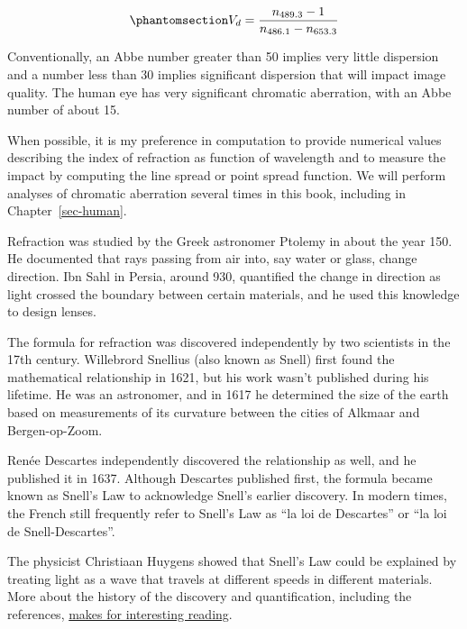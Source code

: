 \documentclass[
  letterpaper,
]{book}
\begin{document}
\begin{equation}\phantomsection\label{eq-abbe}{ 
V_d = \frac{n_{489.3} - 1}{n_{486.1} - n_{653.3}}
}\end{equation}

Conventionally, an Abbe number greater than 50 implies very little
dispersion and a number less than 30 implies significant dispersion that
will impact image quality. The human eye has very significant chromatic
aberration, with an Abbe number of about 15.

When possible, it is my preference in computation to provide numerical
values describing the index of refraction as function of wavelength and
to measure the impact by computing the line spread or point spread
function. We will perform analyses of chromatic aberration several times
in this book, including in Chapter~\ref{sec-human}.

\begin{tcolorbox}[enhanced jigsaw, opacitybacktitle=0.6, breakable, bottomtitle=1mm, leftrule=.75mm, colframe=quarto-callout-note-color-frame, colback=white, left=2mm, opacityback=0, title=\textcolor{quarto-callout-note-color}{\faInfo}\hspace{0.5em}{Historical note: Refraction}, toptitle=1mm, bottomrule=.15mm, titlerule=0mm, arc=.35mm, colbacktitle=quarto-callout-note-color!10!white, toprule=.15mm, rightrule=.15mm, coltitle=black]

Refraction was studied by the Greek astronomer Ptolemy in about the year
150. He documented that rays passing from air into, say water or glass,
change direction. Ibn Sahl in Persia, around 930, quantified the change
in direction as light crossed the boundary between certain materials,
and he used this knowledge to design lenses.

The formula for refraction was discovered independently by two
scientists in the 17th century. Willebrord Snellius (also known as
Snell) first found the mathematical relationship in 1621, but his work
wasn't published during his lifetime. He was an astronomer, and in 1617
he determined the size of the earth based on measurements of its
curvature between the cities of Alkmaar and Bergen-op-Zoom.

Renée Descartes independently discovered the relationship as well, and
he published it in 1637. Although Descartes published first, the formula
became known as Snell's Law to acknowledge Snell's earlier discovery. In
modern times, the French still frequently refer to Snell's Law as ``la
loi de Descartes'' or ``la loi de Snell-Descartes''.

The physicist Christiaan Huygens showed that Snell's Law could be
explained by treating light as a wave that travels at different speeds
in different materials. More about the history of the discovery and
quantification, including the references,
\href{https://en.wikipedia.org/wiki/Snell\%27s_law\#History}{makes for
interesting reading}.

\end{tcolorbox}
\end{document}

